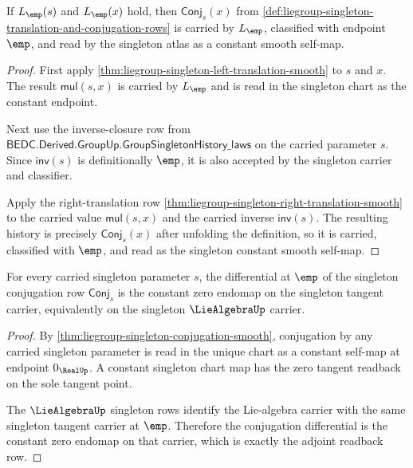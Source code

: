 \begin{theorem}
\label{thm:liegroup-singleton-conjugation-smooth}
If $L_{\emp}(s)$ and $L_{\emp}(x)$ hold, then
$\mathsf{Conj}_s(x)$ from
\autoref{def:liegroup-singleton-translation-and-conjugation-rows} is carried by
$L_{\emp}$, classified with endpoint $\emp$, and read by the singleton atlas as a
constant smooth self-map.
\end{theorem}
\begin{proof}
First apply
\autoref{thm:liegroup-singleton-left-translation-smooth} to $s$ and $x$. The
result $\mathsf{mul}(s,x)$ is carried by $L_{\emp}$ and is read in the singleton
chart as the constant endpoint.

Next use the inverse-closure row from
$\mathsf{BEDC.Derived.GroupUp.GroupSingletonHistory\_laws}$ on the carried
parameter $s$. Since $\mathsf{inv}(s)$ is definitionally $\emp$, it is also
accepted by the singleton carrier and classifier.

Apply the right-translation row
\autoref{thm:liegroup-singleton-right-translation-smooth} to the carried value
$\mathsf{mul}(s,x)$ and the carried inverse $\mathsf{inv}(s)$. The resulting
history is precisely $\mathsf{Conj}_s(x)$ after unfolding the definition, so it
is carried, classified with $\emp$, and read as the singleton constant smooth
self-map.
\end{proof}

\begin{theorem}
\label{thm:liegroup-singleton-adjoint-readback}
For every carried singleton parameter $s$, the differential at $\emp$ of the
singleton conjugation row $\mathsf{Conj}_s$ is the constant zero endomap on the
singleton tangent carrier, equivalently on the singleton $\LieAlgebraUp$ carrier.
\end{theorem}
\begin{proof}
By \autoref{thm:liegroup-singleton-conjugation-smooth}, conjugation by any
carried singleton parameter is read in the unique chart as a constant self-map
at endpoint $0_{\RealUp}$. A constant singleton chart map has the zero tangent
readback on the sole tangent point.

The $\LieAlgebraUp$ singleton rows identify the Lie-algebra carrier with the same
singleton tangent carrier at $\emp$. Therefore the conjugation differential is
the constant zero endomap on that carrier, which is exactly the adjoint readback
row.
\end{proof}

